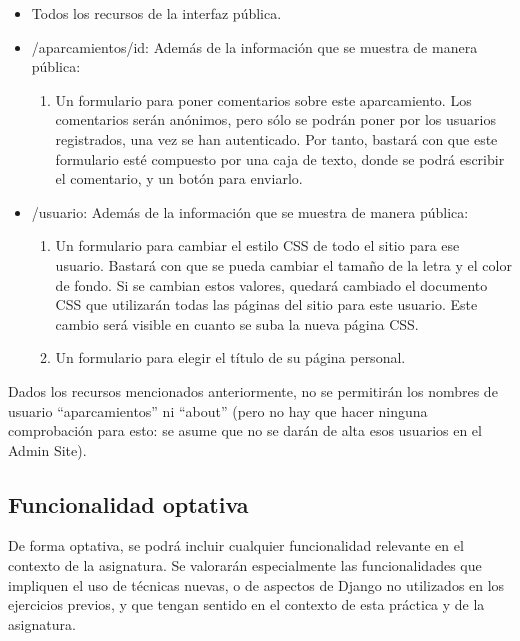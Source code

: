 \begin{itemize}
  \item Todos los recursos de la interfaz pública.
  
  \item /aparcamientos/{id}: Además de la información que se muestra de manera pública:

    \begin{enumerate}
      \item Un formulario para poner comentarios sobre este aparcamiento. Los comentarios serán anónimos, pero sólo se podrán poner por los usuarios registrados, una vez se han autenticado. Por tanto, bastará con que este formulario esté compuesto por una caja de texto, donde se podrá escribir el comentario, y un botón para enviarlo.
  \end{enumerate}

  \item /{usuario}: Además de la información que se muestra de manera pública:
  
  \begin{enumerate}
    \item Un formulario para cambiar el estilo CSS de todo el sitio para ese usuario. Bastará con que se pueda cambiar el tamaño de la letra y el color de fondo. Si se cambian estos valores, quedará cambiado el documento CSS que utilizarán todas las páginas del sitio para este usuario. Este cambio será visible en cuanto se suba la nueva página CSS.

    \item Un formulario para elegir el título de su página personal.
  \end{enumerate}
\end{itemize}


Dados los recursos mencionados anteriormente, no se permitirán los nombres de usuario ``aparcamientos'' ni ``about'' (pero no hay que hacer ninguna comprobación para esto: se asume que no se darán de alta esos usuarios en el Admin Site).


\subsection{Funcionalidad optativa}

De forma optativa, se podrá incluir cualquier funcionalidad relevante en el contexto de la asignatura. Se valorarán especialmente las funcionalidades que impliquen el uso de técnicas nuevas, o de aspectos de Django no utilizados en los ejercicios previos, y que tengan sentido en el contexto de esta práctica y de la asignatura.

